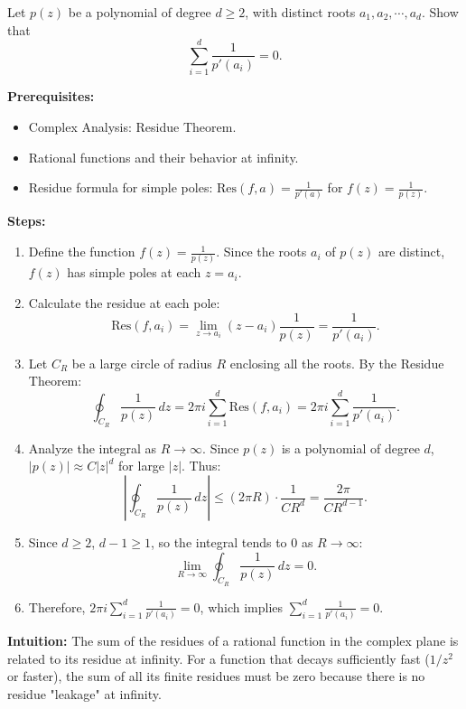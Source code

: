 \begin{exercise}
\label{analysis:2013:2}
Let $p(z)$ be a polynomial of degree $d\geq 2$, with distinct roots $a_1,a_2,\cdots,a_d$. Show that
\[
\sum_{i=1}^d \frac{1}{p'(a_i)} = 0.
\]
\end{exercise}

\begin{solution}
\textbf{Prerequisites:}
\begin{itemize}
    \item Complex Analysis: Residue Theorem.
    \item Rational functions and their behavior at infinity.
    \item Residue formula for simple poles: $\text{Res}(f, a) = \frac{1}{p'(a)}$ for $f(z) = \frac{1}{p(z)}$.
\end{itemize}

\textbf{Steps:}
\begin{enumerate}
    \item Define the function $f(z) = \frac{1}{p(z)}$. Since the roots $a_i$ of $p(z)$ are distinct, $f(z)$ has simple poles at each $z = a_i$.

    \item Calculate the residue at each pole:
    \[
    \text{Res}(f, a_i) = \lim_{z \to a_i} (z - a_i) \frac{1}{p(z)} = \frac{1}{p'(a_i)}.
    \]

    \item Let $C_R$ be a large circle of radius $R$ enclosing all the roots. By the Residue Theorem:
    \[
    \oint_{C_R} \frac{1}{p(z)} \, dz = 2\pi i \sum_{i=1}^d \text{Res}(f, a_i) = 2\pi i \sum_{i=1}^d \frac{1}{p'(a_i)}.
    \]

    \item Analyze the integral as $R \to \infty$. Since $p(z)$ is a polynomial of degree $d$, $|p(z)| \approx C|z|^d$ for large $|z|$. Thus:
    \[
    \left| \oint_{C_R} \frac{1}{p(z)} \, dz \right| \leq (2\pi R) \cdot \frac{1}{C R^d} = \frac{2\pi}{C R^{d-1}}.
    \]

    \item Since $d \geq 2$, $d-1 \geq 1$, so the integral tends to 0 as $R \to \infty$:
    \[
    \lim_{R \to \infty} \oint_{C_R} \frac{1}{p(z)} \, dz = 0.
    \]

    \item Therefore, $2\pi i \sum_{i=1}^d \frac{1}{p'(a_i)} = 0$, which implies $\sum_{i=1}^d \frac{1}{p'(a_i)} = 0$.
\end{enumerate}

\textbf{Intuition:}
The sum of the residues of a rational function in the complex plane is related to its residue at infinity. For a function that decays sufficiently fast ($1/z^2$ or faster), the sum of all its finite residues must be zero because there is no residue "leakage" at infinity.
\end{solution}


